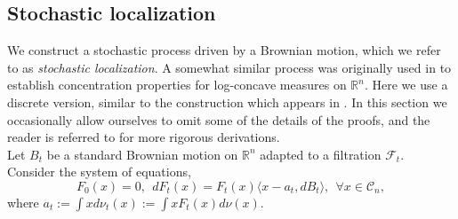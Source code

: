 \documentclass[12pt]{article}
\def \RR {\mathbb R}
\def \DC {\mathcal{C}_n}
\def \FF {\mathcal{F}}
\theoremstyle{definition}
\theoremstyle{remark}
\begin{document}
\subsection{Stochastic localization} \label{sec:stochastic}
We construct a stochastic process driven by a Brownian motion, which we refer to as \emph{stochastic localization}. A somewhat similar process was originally used in \cite{Eldan-thin-KLS} to establish concentration properties for log-concave measures on $\RR^n$. Here we use a discrete version, similar to the construction which appears in \cite{Eldan-taming, eldan2020spectral}. In this section we occasionally allow ourselves to omit some of the details of the proofs, and the reader is referred to \cite{Eldan-taming} for more rigorous derivations. \\

Let $B_t$ be a standard Brownian motion on $\RR^n$ adapted to a filtration $\FF_t$. Consider the system of equations,
\begin{equation}\label{eq:localization}
F_0(x) = 0, ~~ d F_t (x) = F_t(x) \langle x - a_t,  d B_t \rangle, ~~ \forall x \in \DC,
\end{equation}
where $a_t := \int x d \nu_t(x) := \int x F_t(x) d \nu(x)$. \\
\end{document}

